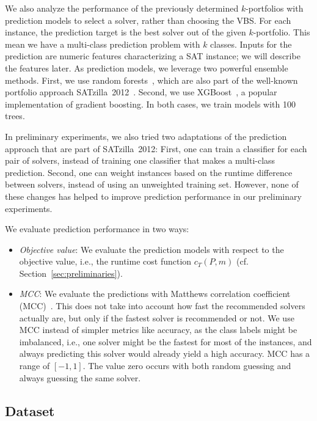 \documentclass[a4paper,USenglish,pdfa]{lipics-v2021} %
\begin{document}
We also analyze the performance of the previously determined $k$-portfolios with prediction models to select a solver, rather than choosing the VBS. 
For each instance, the prediction target is the best solver out of the given $k$-portfolio.
This mean we have a multi-class prediction problem with $k$ classes.
Inputs for the prediction are numeric features characterizing a SAT instance; we will describe the features later. 
As prediction models, we leverage two powerful ensemble methods.
First, we use random forests~\cite{breiman2001random}, which are also part of the well-known portfolio approach SATzilla~2012~\cite{xu2012satzilla2012}.
Second, we use XGBoost~\cite{xgboost}, a popular implementation of gradient boosting.
In both cases, we train models with 100 trees.

In preliminary experiments, we also tried two adaptations of the prediction approach that are part of SATzilla~2012:
First, one can train a classifier for each pair of solvers, instead of training one classifier that makes a multi-class prediction.
Second, one can weight instances based on the runtime difference between solvers, instead of using an unweighted training set.
However, none of these changes has helped to improve prediction performance in our preliminary experiments.

We evaluate prediction performance in two ways:

\begin{itemize}
	\item \emph{Objective value}:
	We evaluate the prediction models with respect to the objective value, i.e., the runtime cost function $c_{T}(P,m)$ (cf. Section~\ref{sec:preliminaries}). 
	\item \emph{MCC}:
	We evaluate the predictions with Matthews correlation coefficient (MCC)~\cite{matthews1975comparison,gorodkin2004comparing}.
	This does not take into account how fast the recommended solvers actually are, but only if the fastest solver is recommended or not.
	We use MCC instead of simpler metrics like accuracy, as the class labels might be imbalanced, i.e., one solver might be the fastest for most of the instances, and always predicting this solver would already yield a high accuracy.
	MCC has a range of $[-1,1]$. 
	The value zero occurs with both random guessing and always guessing the same solver.
\end{itemize}

\subsection{Dataset}
\end{document}
